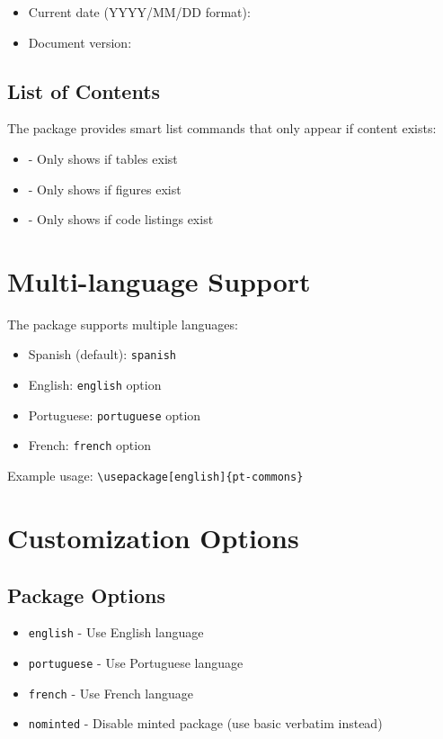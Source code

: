 \documentclass[11pt,letterpaper]{article}
\begin{document}
\begin{itemize}
    \item Current date (YYYY/MM/DD format): \todayymd
    \item Document version: \docversion
\end{itemize}

\subsection{List of Contents}

The package provides smart list commands that only appear if content exists:

\begin{itemize}
    \item {} - Only shows if tables exist
    \item {} - Only shows if figures exist
    \item {} - Only shows if code listings exist
\end{itemize}

\section{Multi-language Support}

The package supports multiple languages:

\begin{itemize}
    \item Spanish (default): \texttt{spanish}
    \item English: \texttt{english} option
    \item Portuguese: \texttt{portuguese} option
    \item French: \texttt{french} option
\end{itemize}

Example usage: \texttt{\textbackslash usepackage[english]\{pt-commons\}}

\section{Customization Options}

\subsection{Package Options}

\begin{itemize}
    \item \texttt{english} - Use English language
    \item \texttt{portuguese} - Use Portuguese language
    \item \texttt{french} - Use French language
    \item \texttt{nominted} - Disable minted package (use basic verbatim instead)
\end{itemize}
\end{document}
